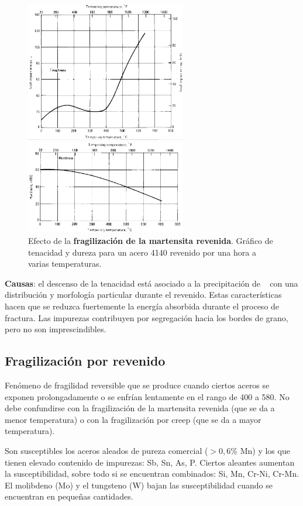 \begin{figure}[htb!]
	\centering
	\includegraphics[width=7cm]{fig/fragilizacionPorRevenidoMartensita.png}\par \vspace{.4cm}
	\includegraphics[width=7cm]{fig/fragilizacionPorRevenidoMartensitaDureza.png}
	\caption{Efecto de la \textbf{fragilización de la martensita revenida}. Gráfico de tenacidad y dureza para un acero 4140 revenido por una hora a varias temperaturas.}
\end{figure}


\textbf{Causas}: el descenso de la tenacidad está asociado a la precipitación de \cementita~ con una distribución y morfología particular durante el revenido. Estas características hacen que se reduzca fuertemente la energía absorbida durante el proceso de fractura. Las impurezas contribuyen por segregación hacia los bordes de grano, pero no son imprescindibles.

\subsection{Fragilización por revenido}
Fenómeno de fragilidad reversible que se produce cuando ciertos aceros se exponen prolongadamente o se enfrían lentamente en el rango de 400 a 580\grad{}. No debe confundirse con la fragilización de la martensita revenida (que se da a menor temperatura) o con la fragilización por creep (que se da a mayor temperatura).

Son susceptibles los aceros aleados de pureza comercial ($>0,6\%$ Mn) y los que tienen elevado contenido de impurezas: Sb, Sn, As, P. Ciertos aleantes aumentan la susceptibilidad, sobre todo si se encuentran combinados: Si, Mn, Cr-Ni, Cr-Mn. El molibdeno (Mo) y el tungsteno (W) bajan las susceptibilidad cuando se encuentran en pequeñas cantidades.


